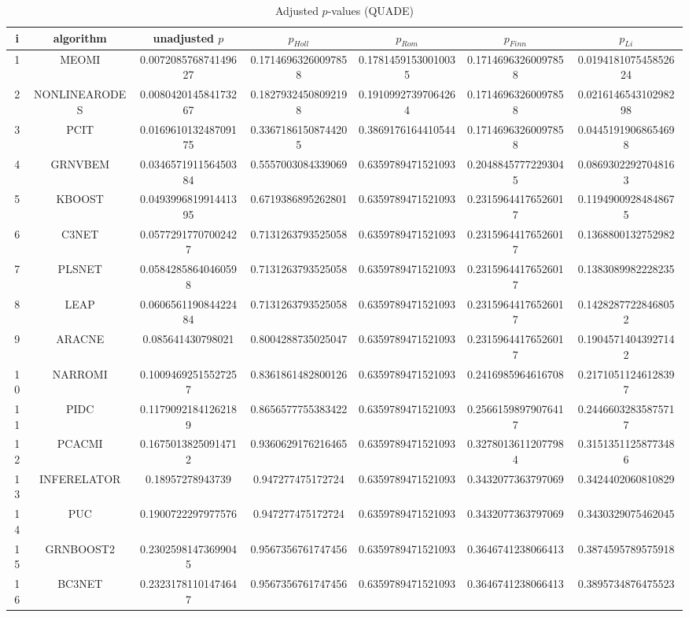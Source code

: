 \documentclass[a4paper,10pt]{article}
\begin{document}
\begin{landscape}
\begin{table}[!htp]
\centering\scriptsize
\caption{Adjusted $p$-values (QUADE)}
\begin{tabular}{ccccccc}
i&algorithm&unadjusted $p$&$p_{Holl}$&$p_{Rom}$&$p_{Finn}$&$p_{Li}$\\
\hline
1&MEOMI&0.007208576874149627&0.17146963260097858&0.17814591530010035&0.17146963260097858&0.019418107545852624\\
2&NONLINEARODES&0.008042014584173267&0.18279324508092198&0.19109927397064264&0.17146963260097858&0.021614654310298298\\
3&PCIT&0.016961013248709175&0.33671861508744205&0.3869176164410544&0.17146963260097858&0.04451919068654698\\
4&GRNVBEM&0.034657191156450384&0.5557003084339069&0.6359789471521093&0.20488457772293045&0.08693022927048163\\
5&KBOOST&0.049399681991441395&0.6719386895262801&0.6359789471521093&0.23159644176526017&0.11949009284848675\\
6&C3NET&0.05772917707002427&0.7131263793525058&0.6359789471521093&0.23159644176526017&0.1368800132752982\\
7&PLSNET&0.05842858640460598&0.7131263793525058&0.6359789471521093&0.23159644176526017&0.1383089982228235\\
8&LEAP&0.060656119084422484&0.7131263793525058&0.6359789471521093&0.23159644176526017&0.14282877228468052\\
9&ARACNE&0.085641430798021&0.8004288735025047&0.6359789471521093&0.23159644176526017&0.19045714043927142\\
10&NARROMI&0.10094692515527257&0.8361861482800126&0.6359789471521093&0.2416985964616708&0.21710511246128397\\
11&PIDC&0.11790921841262189&0.8656577755383422&0.6359789471521093&0.25661598979076417&0.24466032835875717\\
12&PCACMI&0.16750138250914712&0.9360629176216465&0.6359789471521093&0.32780136112077984&0.31513511258773486\\
13&INFERELATOR&0.18957278943739&0.947277475172724&0.6359789471521093&0.3432077363797069&0.3424402060810829\\
14&PUC&0.1900722297977576&0.947277475172724&0.6359789471521093&0.3432077363797069&0.3430329075462045\\
15&GRNBOOST2&0.23025981473699045&0.9567356761747456&0.6359789471521093&0.3646741238066413&0.3874595789575918\\
16&BC3NET&0.23231781101474647&0.9567356761747456&0.6359789471521093&0.3646741238066413&0.3895734876475523\\

\end{tabular}
\end{table}
\end{landscape}
\end{document}
